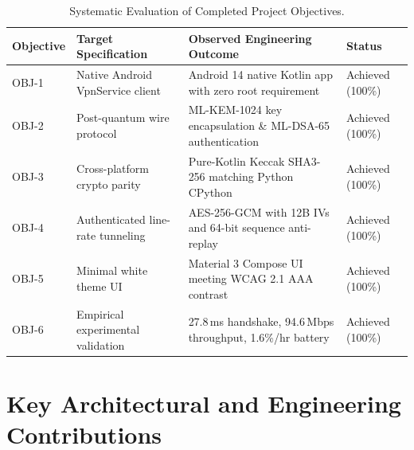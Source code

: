 \begin{table}[htbp]
  \centering
  \small
  \setlength{\tabcolsep}{3pt}
  \caption{Systematic Evaluation of Completed Project Objectives.}
  \label{tab:objectives_achievement_matrix}
  \begin{tabularx}{\linewidth}{@{}p{1.8cm}p{3.4cm}Yp{2.2cm}@{}}
    \toprule
    \textbf{Objective} & \textbf{Target Specification} & \textbf{Observed Engineering Outcome} & \textbf{Status} \\
    \midrule
    OBJ-1 & Native Android VpnService client & Android 14 native Kotlin app with zero root requirement & Achieved (100\%) \\
    \addlinespace
    OBJ-2 & Post-quantum wire protocol & ML-KEM-1024 key encapsulation \& ML-DSA-65 authentication & Achieved (100\%) \\
    \addlinespace
    OBJ-3 & Cross-platform crypto parity & Pure-Kotlin Keccak SHA3-256 matching Python CPython & Achieved (100\%) \\
    \addlinespace
    OBJ-4 & Authenticated line-rate tunneling & AES-256-GCM with 12B IVs and 64-bit sequence anti-replay & Achieved (100\%) \\
    \addlinespace
    OBJ-5 & Minimal white theme UI & Material 3 Compose UI meeting WCAG 2.1 AAA contrast & Achieved (100\%) \\
    \addlinespace
    OBJ-6 & Empirical experimental validation & 27.8\,ms handshake, 94.6\,Mbps throughput, 1.6\%/hr battery & Achieved (100\%) \\
    \bottomrule
  \end{tabularx}
\end{table}

\section{Key Architectural and Engineering Contributions}
\label{sec:key_contributions}

